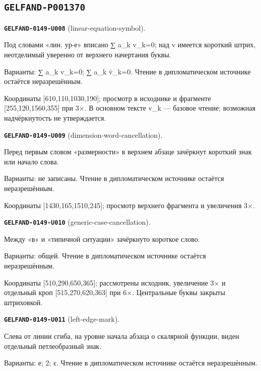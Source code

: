 \documentclass[11pt]{article}
\theoremstyle{definition}
\theoremstyle{remark}
\begin{document}
\subsection*{\texttt{GELFAND-P001370}}
\noindent\leavevmode{}\label{GELFAND-P001370:linear-equation-symbol:note}\textbf{\texttt{GELFAND-0149-U008}} (linear-equation-symbol).\par\nopagebreak[4]
Под словами «лин. ур-е» вписано ∑ a\_k v\_k=0; над v имеется короткий штрих, неотделимый уверенно от верхнего начертания буквы.\par
Варианты: ∑ a\_k v\_k=0; ∑ a\_k v̄\_k=0. Чтение в дипломатическом источнике остаётся неразрешённым.\par
Координаты [610,110,1030,190]; просмотр в исходнике и фрагменте [255,120,1560,355] при 3×. В основном тексте v\_k — базовое чтение; возможная надчёркнутость не утверждается.\par\medskip
\noindent\leavevmode{}\label{GELFAND-P001370:dimension-word-cancellation:note}\textbf{\texttt{GELFAND-0149-U009}} (dimension-word-cancellation).\par\nopagebreak[4]
Перед первым словом «размерности» в верхнем абзаце зачёркнут короткий знак или начало слова.\par
Варианты: не записаны. Чтение в дипломатическом источнике остаётся неразрешённым.\par
Координаты [1430,165,1510,245]; просмотр верхнего фрагмента и увеличения 3×.\par\medskip
\noindent\leavevmode{}\label{GELFAND-P001370:generic-case-cancellation:note}\textbf{\texttt{GELFAND-0149-U010}} (generic-case-cancellation).\par\nopagebreak[4]
Между «в» и «типичной ситуации» зачёркнуто короткое слово.\par
Варианты: общей. Чтение в дипломатическом источнике остаётся неразрешённым.\par
Координаты [510,290,650,365]; рассмотрены исходник, увеличение 3× и отдельный кроп [515,270,620,363] при 6×. Центральные буквы закрыты штриховкой.\par\medskip
\noindent\leavevmode{}\label{GELFAND-P001370:left-edge-mark:note}\textbf{\texttt{GELFAND-0149-U011}} (left-edge-mark).\par\nopagebreak[4]
Слева от линии сгиба, на уровне начала абзаца о скалярной функции, виден отдельный петлеобразный знак.\par
Варианты: е; 2; ε. Чтение в дипломатическом источнике остаётся неразрешённым.\par
\end{document}
